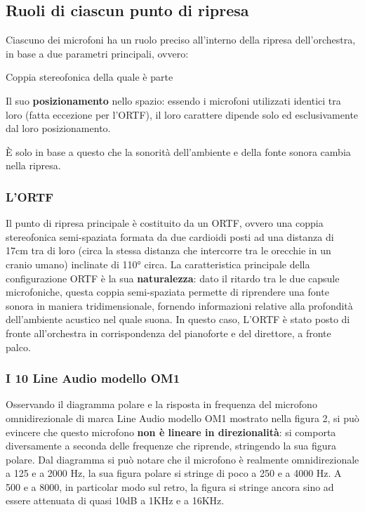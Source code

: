 	\subsection{Ruoli di ciascun punto di ripresa}
	Ciascuno dei microfoni ha un ruolo preciso all'interno della ripresa dell'orchestra, in base a due parametri principali, ovvero:
	\begin{compactitem}
		\item Coppia stereofonica della quale è parte
		\item Il suo \textbf{posizionamento} nello spazio: essendo i microfoni utilizzati identici tra loro (fatta eccezione per l'ORTF), il loro carattere dipende solo ed esclusivamente dal loro posizionamento.
	\end{compactitem}
	È solo in base a questo che la sonorità dell'ambiente e della fonte sonora cambia nella ripresa.
	
	\subsubsection{L'ORTF}
	Il punto di ripresa principale è costituito da un ORTF, ovvero una coppia stereofonica semi-spaziata formata da due cardioidi posti ad una distanza di 17cm tra di loro (circa la stessa distanza che intercorre tra le orecchie in un cranio umano) inclinate di 110° circa.
	La caratteristica principale della configurazione ORTF è la sua \textbf{naturalezza}: dato il ritardo tra le due capsule microfoniche, questa coppia semi-spaziata permette di riprendere una fonte sonora in maniera tridimensionale, fornendo informazioni relative alla profondità dell'ambiente acustico nel quale suona.
	In questo caso, L'ORTF è stato posto di fronte all'orchestra in corrispondenza del pianoforte e del direttore, a fronte palco.
	
	\subsubsection{I 10 Line Audio modello OM1}
	Osservando il diagramma polare e la risposta in frequenza del microfono omnidirezionale di marca Line Audio modello OM1 mostrato nella figura 2, si può evincere che questo microfono \textbf{non è lineare in direzionalità}: si comporta diversamente a seconda delle frequenze che riprende, stringendo la sua figura polare. Dal diagramma si può notare che il microfono è realmente omnidirezionale a 125 e a 2000 Hz, la sua figura polare si stringe di poco a 250 e a 4000 Hz. A 500 e a 8000, in particolar modo sul retro, la figura si stringe ancora sino ad essere attenuata di quasi 10dB a 1KHz e a 16KHz.
	
